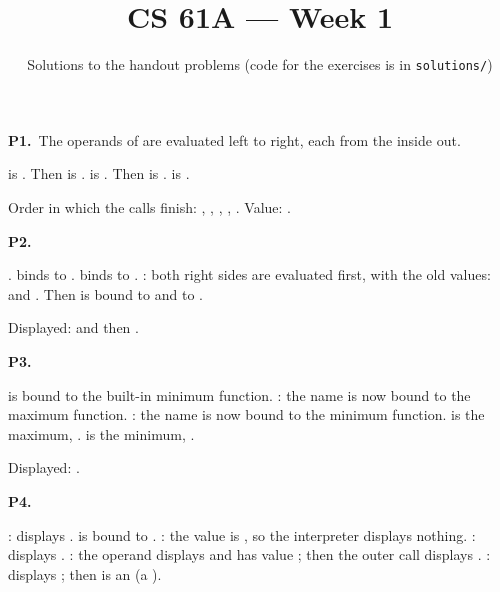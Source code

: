 \documentclass[10pt]{scrartcl}
\title{CS 61A --- Week 1}
\subtitle{Solutions to the handout problems (code for the exercises is in \texttt{solutions/})}
\author{}\date{}\ihead{}
\begin{document}
\maketitle

\begin{prob}\textbf{P1.}\ The operands of  are evaluated left to right, each from the inside out.
\begin{steps}
  \ii {} is . Then  is .
  \ii {} is . Then  is .
  \ii {} is .
\end{steps}
Order in which the calls finish: , , , , . Value: .
\end{prob}

\begin{prob}\textbf{P2.}
\begin{steps}
  \ii {}.  binds  to .  binds  to .
  \ii {}: both right sides are evaluated first, with the old values:  and . Then  is bound to  and  to .
\end{steps}
Displayed:  and then .
\end{prob}

\begin{prob}\textbf{P3.}
\begin{steps}
  \ii {} is bound to the built-in minimum function.
  \ii {}: the name  is now bound to the maximum function.
  \ii {}: the name  is now bound to the minimum function.
  \ii {} is the maximum, .  is the minimum, .
\end{steps}
Displayed: .
\end{prob}

\begin{prob}\textbf{P4.}
\begin{steps}
  \ii {}: displays .  is bound to .
  \ii {}: the value is , so the interpreter displays nothing.
  \ii {}: displays .
  \ii {}: the operand  displays  and has value ; then the outer call displays .
  \ii {}: displays ; then  is an  (a ).
\end{steps}
\end{prob}
\end{document}
